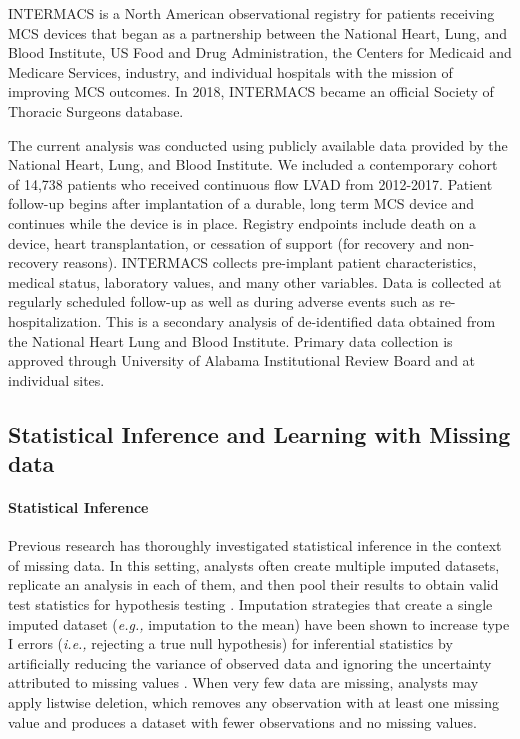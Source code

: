\documentclass{article}
\begin{document}
INTERMACS is a North American observational registry for patients
receiving MCS devices that began as a partnership between the National
Heart, Lung, and Blood Institute, US Food and Drug Administration, the
Centers for Medicaid and Medicare Services, industry, and individual
hospitals with the mission of improving MCS outcomes. In 2018, INTERMACS
became an official Society of Thoracic Surgeons database.

The current analysis was conducted using publicly available data
provided by the National Heart, Lung, and Blood Institute. We included a
contemporary cohort of 14,738 patients who received continuous flow LVAD
from 2012-2017. Patient follow-up begins after implantation of a
durable, long term MCS device and continues while the device is in
place. Registry endpoints include death on a device, heart
transplantation, or cessation of support (for recovery and non-recovery
reasons). INTERMACS collects pre-implant patient characteristics,
medical status, laboratory values, and many other variables. Data is
collected at regularly scheduled follow-up as well as during adverse
events such as re-hospitalization. This is a secondary analysis of
de-identified data obtained from the National Heart Lung and Blood
Institute. Primary data collection is approved through University of
Alabama Institutional Review Board and at individual sites.

\hypertarget{statistical-inference-and-learning-with-missing-data}{%
\subsection{Statistical Inference and Learning with Missing
data}\label{statistical-inference-and-learning-with-missing-data}}

\label{subsec:inference_and_learning}

\paragraph{Statistical Inference}

Previous research has thoroughly investigated statistical inference in
the context of missing data. In this setting, analysts often create
multiple imputed datasets, replicate an analysis in each of them, and
then pool their results to obtain valid test statistics for hypothesis
testing \cite{rubin2004multiple}. Imputation strategies that create a
single imputed dataset (\textit{e.g., }imputation to the mean) have been
shown to increase type I errors (\textit{i.e., }rejecting a true null
hypothesis) for inferential statistics by artificially reducing the
variance of observed data and ignoring the uncertainty attributed to
missing values \cite{van2018flexible}. When very few data are missing,
analysts may apply listwise deletion, which removes any observation with
at least one missing value and produces a dataset with fewer
observations and no missing values.
\end{document}
